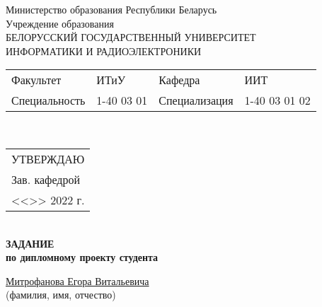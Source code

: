 {
  \thispagestyle{empty}
  \setlength{\parindent}{0em}

  \newcommand{\lineunderscore}{\uline{\hspace*{\fill}}}

  \begin{center}
    Министерство образования Республики Беларусь\\
    Учреждение образования\\
    БЕЛОРУССКИЙ ГОСУДАРСТВЕННЫЙ УНИВЕРСИТЕТ \\
    ИНФОРМАТИКИ И РАДИОЭЛЕКТРОНИКИ\\[1em]
  

  \begin{minipage}{\textwidth}
    \begin{flushleft}
      \begin{tabular}{ p{}p{}p{}p{} @{} }
        Факультет & ИТиУ & Кафедра & ИИТ \\
        Специальность   & 1-40 03 01 & Специализация & 1-40 03 01 02
      \end{tabular}
    \end{flushleft}
  \end{minipage}\\[1em]

  \begin{minipage}{\textwidth}
    \begin{flushright}
      \begin{tabular}{p{}}
        УТВЕРЖДАЮ \\[0.5em]
        \underline{\hspace*{7em}}     Зав. кафедрой \\
        
        <<\underline{\hspace*{4ex}}>> \underline{\hspace*{7em}} 2022 г.
      \end{tabular}
    \end{flushright}
  \end{minipage}\\[1em]

  \textbf{ЗАДАНИЕ} \\
  \textbf{по дипломному проекту студента}

  \lineunderscore\uline{Митрофанова Егора Витальевича}\lineunderscore \\
  {\small (фамилия, имя, отчество) }


\end{center}}
